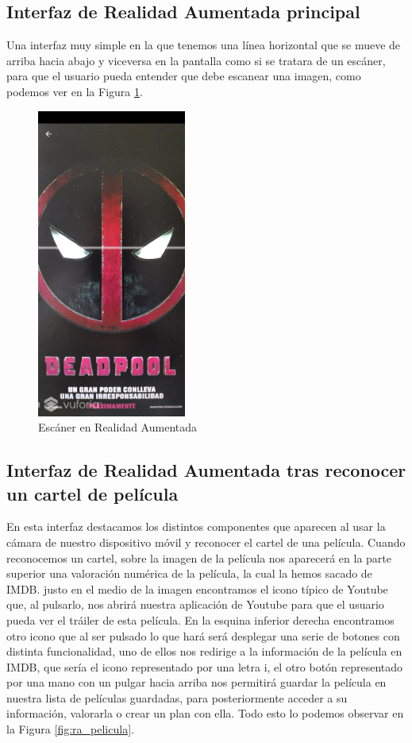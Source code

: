 \subsection{Interfaz de Realidad Aumentada principal}
\label{makereference3.4.4}
Una interfaz muy simple en la que tenemos una línea horizontal que se mueve de arriba hacia abajo y viceversa en la pantalla como si se tratara de un escáner, para que el usuario
pueda entender que debe escanear una imagen, como podemos ver en la Figura \ref{fig:escaner}.
\begin{figure}[H]
    \centering
    \includegraphics[height=4in]{figures/chapter-3/escaner.jpg}
    \caption{Escáner en Realidad Aumentada}
    \label{fig:escaner}
\end{figure}
\subsection{Interfaz de Realidad Aumentada tras reconocer un cartel de película}
\label{makereference3.4.5}
En esta interfaz destacamos los distintos componentes que aparecen al usar la cámara de nuestro dispositivo móvil y reconocer el cartel de una película.
Cuando reconocemos un cartel, sobre la imagen de la película nos aparecerá en la parte superior una valoración numérica de la película, la cual la hemos 
sacado de IMDB. justo en el medio de la imagen encontramos el icono típico de Youtube que, al pulsarlo, nos abrirá nuestra aplicación de Youtube para que
el usuario pueda ver el tráiler de esta película. En la esquina inferior derecha encontramos otro icono que al ser pulsado lo que hará será desplegar una serie de botones con distinta funcionalidad,
uno de ellos nos redirige a la información de la película en IMDB, que sería el icono representado por una letra i, el otro botón representado por una mano con un pulgar hacia arriba nos permitirá
guardar la película en nuestra lista de películas guardadas, para posteriormente acceder a su información, valorarla o crear un plan con ella. Todo esto lo podemos observar en la Figura \ref{fig:ra_pelicula}.

